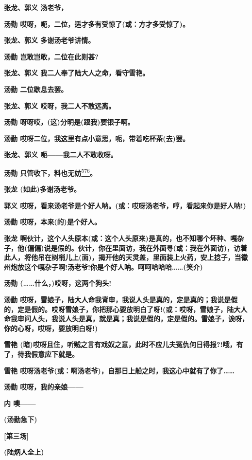 \textbf{张龙、郭义 汤老爷，}

\textbf{汤勤 哎呀，呃，二位，适才多有受惊了(或：方才多受惊了)。}

\textbf{张龙、郭义 多谢汤老爷讲情。}

\textbf{汤勤 岂敢岂敢，二位在此则甚?}

\textbf{张龙、郭义 我二人奉了陆大人之命，看守雪艳。}

\textbf{汤勤 二位歇息去罢。}

\textbf{张龙、郭义 哎呀，我二人不敢远离。}

\textbf{汤勤 呀呀哎，(这)分明是(跟我)要银子啊。}

\textbf{汤勤 哎呀二位，我这里有点小意思，呃，带着吃杯茶(去)罢。}

\textbf{张龙、郭义 呃------我二人不敢收呀。}

\textbf{汤勤
只管收下，料也无妨}\protect\hyperlink{fn576}{\textsuperscript{576}}\textbf{。}

\textbf{张龙 (如此)多谢汤老爷。}

\textbf{郭义
哎呀，看来汤老爷是个好人呐。(或：哎呀汤老爷，哼，看起来你是好人呐!)}

\textbf{汤勤 哎呀，本来(的)是个好人。}

\textbf{张龙
啊伙计，这个人头原本(或：这个人头原来)是真的，也不知哪个坏种、嘎杂子，他(偏偏)说是假的。伙计，你在里面访，我在外面寻(或：我在外面访)，访着此人，将他吊在树梢儿上(面)，揭开他的天灵盖，里面装上火药，安上捻子，当徽州炮放这个嘎杂子啊!汤老爷!你是个好人呐。呵呵哈哈哈\ldots{}\ldots{}(笑介)}

\textbf{汤勤 (\ldots{}\ldots{}什么，)哎呀，这两个狗头!}

\textbf{汤勤
哎呀，雪娘子，陆大人命我背审，我说人头是真的，定是真的；我说是假的，定是假的。哎呀雪娘子，你把那心要放明白了呀!(或：哎呀，雪娘子，陆大人命我审问人头，我说人头是真，就是真；我说是假的，定是假的。雪娘子，诶呀，你的心呀，哎呀，要放明白呀!)}

\textbf{雪艳
(暗)哎呀且住，听贼之言有戏奴之意，此时不应儿夫冤仇何日得报?!哦，有了，待我假意应下就是。}

\textbf{雪艳
哎呀汤老爷(或：啊汤老爷)，自那日上船之时，我这心中就有了你了\ldots{}\ldots{}}

\textbf{汤勤 哎呀，我的亲娘------}

\textbf{内 噢------}

\textbf{(汤勤急下)}

\textbf{{[}第三场{]}}

\textbf{(陆炳人全上)}

